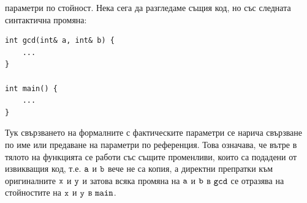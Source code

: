\documentclass{article}
\begin{document}
параметри по стойност. \newline\newline
Нека сега да разгледаме същия код, но със следната синтактична промяна:
\begin{lstlisting}[style=cpp]
int gcd(int& a, int& b) {
    ...
}

int main() {
    ...
}
\end{lstlisting}
Тук свързването на формалните с фактическите параметри се нарича свързване по име или предаване на параметри по референция.
Това означава, че вътре в тялото на функцията се работи със същите променливи, които са подадени от извикващия код, т.е.
$\textcolor{black}{\texttt{a}}$ и $\textcolor{black}{\texttt{b}}$ вече не са копия, а директни препратки към оригиналните $\textcolor{black}{\texttt{x}}$ и $\textcolor{black}{\texttt{y}}$ и
затова всяка промяна на $\textcolor{black}{\texttt{a}}$ и $\textcolor{black}{\texttt{b}}$ в $\textcolor{black}{\texttt{gcd}}$ се отразява на стойностите на $\textcolor{black}{\texttt{x}}$ и $\textcolor{black}{\texttt{y}}$
в $\textcolor{black}{\texttt{main}}$.
\end{document}
